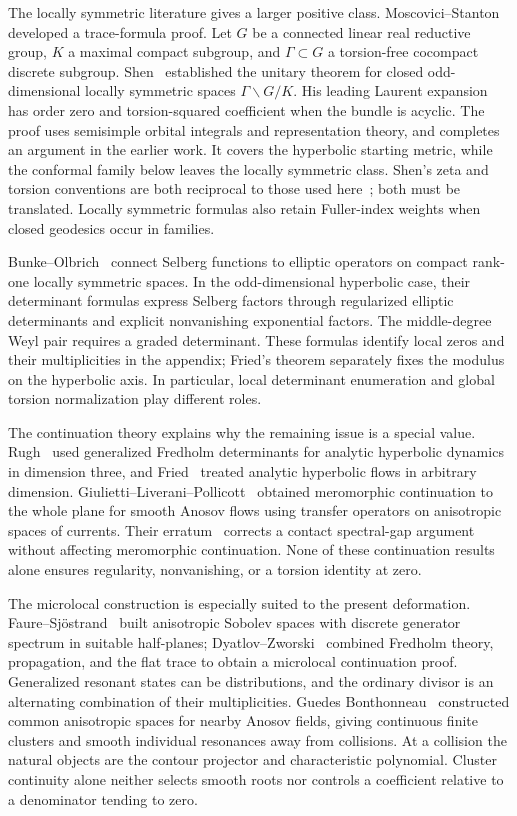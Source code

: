 \documentclass[11pt,letterpaper,reqno]{amsart}
\theoremstyle{remark}
\begin{document}
The locally symmetric literature gives a larger positive class.
Moscovici--Stanton~\cite{MoSt} developed a trace-formula proof. Let $G$
be a connected linear real reductive group, $K$ a maximal compact
subgroup, and $\Gamma\subset G$ a torsion-free cocompact discrete
subgroup. Shen~\cite{Shen} established the unitary theorem for closed
odd-dimensional locally symmetric spaces $\Gamma\backslash G/K$.
His leading Laurent expansion has order zero and
torsion-squared coefficient when the bundle is acyclic. The proof uses
semisimple orbital integrals and representation theory, and completes
an argument in the earlier work. It covers the hyperbolic starting
metric, while the conformal family below leaves the locally symmetric
class. Shen's zeta and torsion conventions are both reciprocal to
those used here~\cite[(1-4)--(1-5)]{Shen}; both must be translated.
Locally symmetric formulas also retain Fuller-index weights when
closed geodesics occur in families.

Bunke--Olbrich~\cite{BObook,BO} connect Selberg functions to elliptic
operators on compact rank-one locally symmetric spaces. In the
odd-dimensional hyperbolic case, their determinant formulas express
Selberg factors through regularized elliptic determinants and explicit
nonvanishing exponential factors. The middle-degree Weyl pair requires
a graded determinant. These formulas identify local zeros and their
multiplicities in the appendix; Fried's theorem separately fixes the
modulus on the hyperbolic axis. In particular, local determinant
enumeration and global torsion normalization play different roles.

The continuation theory explains why the remaining issue is a special
value. Rugh~\cite{Rugh} used generalized Fredholm determinants for
analytic hyperbolic dynamics in dimension three, and
Fried~\cite{Fried95} treated analytic hyperbolic flows in arbitrary
dimension. Giulietti--Liverani--Pollicott~\cite{GLP} obtained
meromorphic continuation to the whole plane for smooth Anosov flows
using transfer operators on anisotropic spaces of currents. Their
erratum~\cite{GLPErr} corrects a contact spectral-gap argument without
affecting meromorphic continuation. None of these continuation results
alone ensures regularity, nonvanishing, or a torsion identity at zero.

The microlocal construction is especially suited to the present
deformation. Faure--Sj\"ostrand~\cite{FS} built anisotropic Sobolev
spaces with discrete generator spectrum in suitable half-planes;
Dyatlov--Zworski~\cite{DZ16} combined Fredholm theory, propagation,
and the flat trace to obtain a microlocal continuation proof.
Generalized resonant states can be distributions, and the ordinary
divisor is an alternating combination of their multiplicities.
Guedes Bonthonneau~\cite{Bon} constructed common anisotropic spaces
for nearby Anosov fields, giving continuous finite clusters and smooth
individual resonances away from collisions. At a collision the natural
objects are the contour projector and characteristic polynomial.
Cluster continuity alone neither selects smooth roots nor controls a
coefficient relative to a denominator tending to zero.
\end{document}
